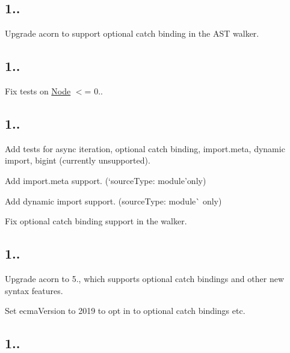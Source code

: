 \subsection*{1..}


\begin{DoxyItemize}
\item Upgrade acorn to support optional catch binding in the A\+ST walker.
\end{DoxyItemize}

\subsection*{1..}


\begin{DoxyItemize}
\item Fix tests on \mbox{\hyperlink{classNode}{Node}} $<$= 0..
\end{DoxyItemize}

\subsection*{1..}


\begin{DoxyItemize}
\item Add tests for async iteration, optional catch binding, import.\+meta, dynamic import, bigint (currently unsupported).
\item Add import.\+meta support. (`source\+Type\+: \textquotesingle{}module'{\ttfamily only)}
\item {\ttfamily Add dynamic import support. (}source\+Type\+: \textquotesingle{}module\textquotesingle{}\`{} only)
\item Fix optional catch binding support in the walker.
\end{DoxyItemize}

\subsection*{1..}


\begin{DoxyItemize}
\item Upgrade acorn to 5., which supports optional catch bindings and other new syntax features.
\item Set ecma\+Version to 2019 to opt in to optional catch bindings etc.
\end{DoxyItemize}

\subsection*{1..}



